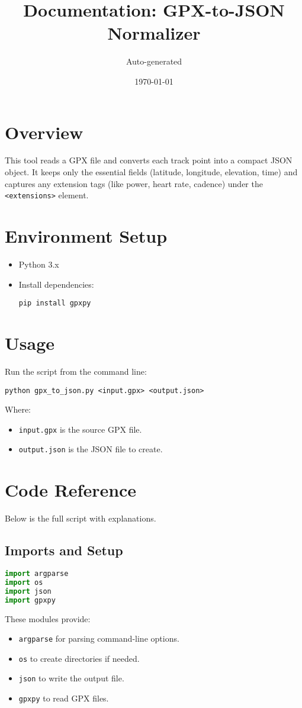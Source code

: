 \documentclass{article}
\title{Documentation: GPX-to-JSON Normalizer}
\author{Auto-generated}
\date{\today}
\begin{document}
\maketitle

\section{Overview}
This tool reads a GPX file and converts each track point into a compact JSON object. It keeps only the essential fields (latitude, longitude, elevation, time) and captures any extension tags (like power, heart rate, cadence) under the \texttt{<extensions>} element.

\section{Environment Setup}
\begin{itemize}
	\item Python 3.x
	\item Install dependencies:
	      \begin{lstlisting}
pip install gpxpy
    \end{lstlisting}
\end{itemize}

\section{Usage}
Run the script from the command line:
\begin{lstlisting}
python gpx_to_json.py <input.gpx> <output.json>
\end{lstlisting}

\noindent
Where:
\begin{itemize}
	\item \texttt{input.gpx} is the source GPX file.
	\item \texttt{output.json} is the JSON file to create.
\end{itemize}

\section{Code Reference}
Below is the full script with explanations.

\subsection{Imports and Setup}
\begin{lstlisting}[language=Python]
import argparse
import os
import json
import gpxpy
\end{lstlisting}
These modules provide:
\begin{itemize}
	\item \texttt{argparse} for parsing command-line options.
	\item \texttt{os} to create directories if needed.
	\item \texttt{json} to write the output file.
	\item \texttt{gpxpy} to read GPX files.
\end{itemize}
\end{document}
